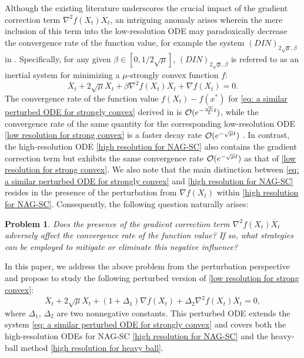 \documentclass[11pt]{article}
\newcommand{\1}{\mathbf 1}
\numberwithin{equation}{section}
\newtheorem{PB}{Problem}
\begin{document}
Although the existing literature underscores the crucial impact of the gradient correction term $\nabla^2 f(X_t)\dot{X_t}$, an intriguing anomaly arises wherein the mere inclusion of this term into the low-resolution ODE may paradoxically decrease the convergence rate of the function value, for example the system $(DIN)_{2\sqrt{\mu},\beta}$ in \cite{Attouch_2022_first-order}. Specifically, for any given $\beta \in [0,1/2\sqrt{\mu}]$, $(DIN)_{2\sqrt{\mu},\beta}$ is referred to as an inertial system for minimizing a $\mu$-strongly convex function $f$:
\begin{equation}
    \label{eq: a similar perturbed ODE for strongly convex}
    \ddot{X_t}+2\sqrt{\mu}\dot{X_t}+\beta \nabla^2 f(X_t)\dot{X_t}+\nabla f(X_t)=0.
\end{equation}
The convergence rate of the function value $f(X_t)-f(x^*)$ for \eqref{eq: a similar perturbed ODE for strongly convex} derived in \cite[{Theorem 7(i)}]{Attouch_2022_first-order} is ${\cal O}(e^{-\frac{\sqrt{\mu}}{2}t})$, 
 while the convergence rate of the same quantity for the corresponding low-resolution ODE \eqref{low resolution for strong convex} is a faster decay rate ${\cal O}(e^{-\sqrt{\mu}t})$ \cite[{Proposition 3}]{Wilson_2021_lyapunov}.
In contrast, the high-resolution ODE \eqref{high resolution for NAG-SC} also contains the gradient correction term but exhibits the same convergence rate ${\cal O}(e^{-\sqrt{\mu}t})$ as that of \eqref{low resolution for strong convex}. We also note that the main distinction between \eqref{eq: a similar perturbed ODE for strongly convex} and \eqref{high resolution for NAG-SC} resides in the presence of the perturbation from $\nabla f(X_t)$ within \eqref{high resolution for NAG-SC}. Consequently, the following question naturally arises:
\begin{PB}
    \label{pb: the problems of this paper}
    Does the presence of the gradient correction term $\nabla^2 f(X_t)\dot{X_t}$ adversely affect the convergence rate of the function value? If so, what strategies can be employed to mitigate or eliminate this negative influence?
\end{PB}
In this paper, we address the above problem from the perturbation perspective and propose to study the following perturbed version of \eqref{low resolution for strong convex}:
\begin{equation}
\label{eq:general_perturbed_ODE}
\ddot{X_t}+2\sqrt{\mu}\dot{X_t}+(1+\Delta_1)\nabla f(X_t)+\Delta_2\nabla^2 f(X_t)\dot{X_t}=0,
\end{equation}
where $\Delta_1$, $\Delta_2$ are two nonnegative constants. 
This perturbed ODE extends the system  \eqref{eq: a similar perturbed ODE for strongly convex} and covers both the high-resolution ODEs for NAG-SC \eqref{high resolution for NAG-SC} and the heavy-ball method \eqref{high resolution for heavy ball}.  
\end{document}
